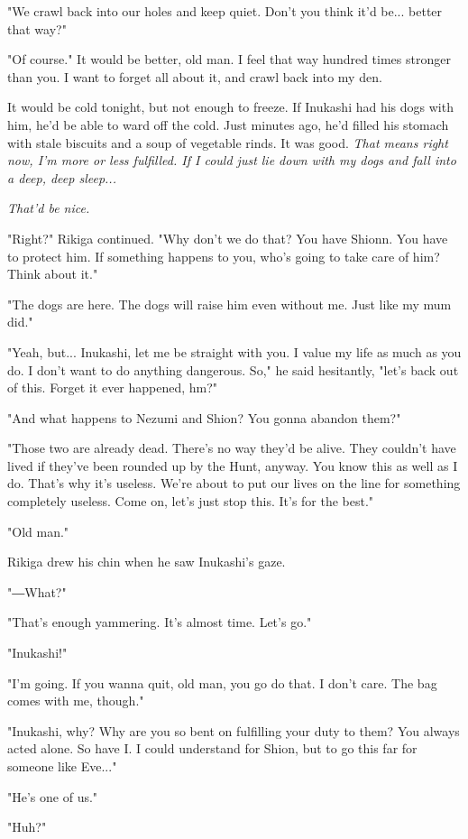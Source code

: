 "We crawl back into our holes and keep quiet. Don't you think it'd be...
better that way?"

"Of course." It would be better, old man. I feel that way hundred times
stronger than you. I want to forget all about it, and crawl back into my
den.

It would be cold tonight, but not enough to freeze. If Inukashi had his
dogs with him, he'd be able to ward off the cold. Just minutes ago, he'd
filled his stomach with stale biscuits and a soup of vegetable rinds. It
was good. \emph{That means right now, I'm more or less fulfilled. If I could
	just lie down with my dogs and fall into a deep, deep sleep...}

\emph{That'd be nice.}

"Right?" Rikiga continued. "Why don't we do that? You have Shionn. You
have to protect him. If something happens to you, who's going to take
care of him? Think about it."

"The dogs are here. The dogs will raise him even without me. Just like
my mum did."

"Yeah, but... Inukashi, let me be straight with you. I value my life as
much as you do. I don't want to do anything dangerous. So," he said
hesitantly, "let's back out of this. Forget it ever happened, hm?"

"And what happens to Nezumi and Shion? You gonna abandon them?"

"Those two are already dead. There's no way they'd be alive. They
couldn't have lived if they've been rounded up by the Hunt, anyway. You
know this as well as I do. That's why it's useless. We're about to put
our lives on the line for something completely useless. Come on, let's
just stop this. It's for the best."

"Old man."

Rikiga drew his chin when he saw Inukashi's gaze.

"―What?"

"That's enough yammering. It's almost time. Let's go."

"Inukashi!"

"I'm going. If you wanna quit, old man, you go do that. I don't care.
The bag comes with me, though."

"Inukashi, why? Why are you so bent on fulfilling your duty to them? You
always acted alone. So have I. I could understand for Shion, but to go
this far for someone like Eve..."

"He's one of us."

"Huh?"

